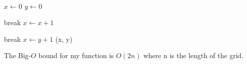 \documentclass[oneside, a4paper]{article}
\begin{document}
\
\begin{algorithmic}[1]
    \State $x \gets 0$
    \State $y \gets 0$
    
            \State break
        \Else \State $x \gets x + 1$
        \EndIf
    \EndWhile
    
            \State break
        \Else \State $x \gets y + 1$
        \EndIf
    \EndWhile
    \State \Return (x, y)
    \EndFunction
\end{algorithmic}

The Big-$O$ bound for my function is $O(2n)$ where n is the length of the grid.
\end{document}
